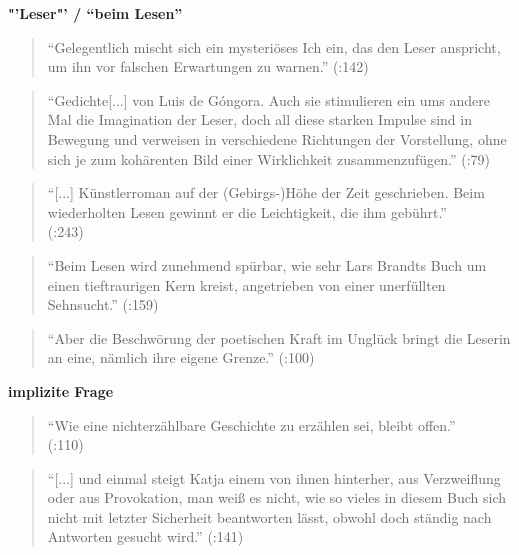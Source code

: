 \documentclass[fontsize=12pt]{scrartcl}
\begin{document}
\textbf{"'Leser"' / "`beim Lesen"'}

\singlespacing
\begin{quote}
"`Gelegentlich mischt sich ein mysteri\"oses Ich ein, das den Leser anspricht, um ihn vor falschen Erwartungen zu warnen."' (\cite{Hartwig2012}:142)
\end{quote}
\onehalfspacing


\singlespacing
\begin{quote}
"`Gedichte[...] von Luis de G\'{o}ngora. Auch sie stimulieren ein ums andere Mal die Imagination der Leser, doch all diese starken Impulse sind in Bewegung und verweisen in verschiedene Richtungen der Vorstellung, ohne sich je zum koh\"arenten Bild einer Wirklichkeit zusammenzuf\"ugen."' (\cite{Gumbrecht2011}:79)
\end{quote}
\onehalfspacing



\singlespacing
\begin{quote}
"`[...] K\"unstlerroman auf der (Gebirgs-)H\"ohe der Zeit geschrieben. Beim wiederholten Lesen gewinnt er die Leichtigkeit, die ihm geb\"uhrt."'\\ (\cite{Hartwig2012}:243)
\end{quote}
\onehalfspacing



\singlespacing
\begin{quote}
"`Beim Lesen wird zunehmend sp\"urbar, wie sehr Lars Brandts Buch um einen tieftraurigen Kern kreist, angetrieben von einer unerf\"ullten Sehnsucht."' (\cite{Hartwig2012}:159)\\
\end{quote}
\onehalfspacing

\singlespacing
\begin{quote}
"`Aber die Beschw\"orung der poetischen Kraft im Ungl\"uck bringt die Le\-se\-rin an eine, n\"amlich ihre eigene Grenze."' (\cite{Hartwig2012}:100)
\end{quote}
\onehalfspacing


\textbf{implizite Frage}

\singlespacing
\begin{quote}
"`Wie eine nichterz\"ahlbare Geschichte zu erz\"ahlen sei, bleibt offen."'\\ (\cite{Hartwig2012}:110)
\end{quote}
\onehalfspacing


\singlespacing
\begin{quote}
"`[...] und einmal steigt Katja einem von ihnen hinterher, aus Verzweiflung oder aus Provokation, man wei{\ss} es nicht, wie so vieles in diesem Buch sich nicht mit letzter Sicherheit beantworten l\"asst, obwohl doch st\"andig nach Antworten gesucht wird."' (\cite{Hartwig2012}:141)
\end{quote}
\onehalfspacing
\end{document}
